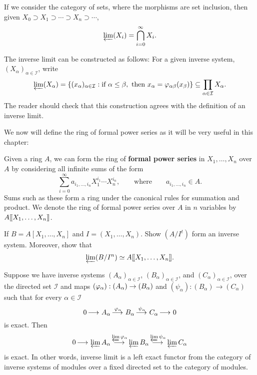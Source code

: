 \documentclass{ximera}
\begin{document}
\begin{example} If we consider the category of sets, where the morphisms are set inclusion, then given $X_0\supset X_1\supset \cdots \supset X_n\supset \cdots$,
\[
\varprojlim(X_i) = \bigcap_{i=0}^\infty X_i.
\]
\end{example}

\begin{example} The inverse limit can be constructed as follows: For a given inverse system, $(X_\alpha)_{\alpha\in \mathcal{I}}$, write
\[
\varprojlim(X_\alpha) = \{(x_\alpha)_{\alpha\in \mathcal{I}}:\text{if }\alpha\le \beta,\text{ then }x_\alpha = \varphi_{\alpha\beta}(x_\beta) \}\subseteq \prod_{\alpha\in \mathcal{I}} X_\alpha.
\]
The reader should check that this construction agrees with the definition of an inverse limit.
\end{example}

We now will define the ring of formal power series as it will be very useful in this chapter: 

\begin{definition} Given a ring $A$, we can form the ring of \textbf{formal power series} in $X_1,\dots,X_n$ over $A$ by considering all infinite sums of the form
\[
\sum_{i=0}^\infty a_{i_1,\dots, i_n}X_1^{i_1}\cdots X_n^{i_n},\qquad\text{where} \qquad a_{i_1,\dots, i_n}\in A.
\]
Sums such as these form a ring under the canonical rules for summation and product. We denote the ring of formal power series over $A$ in $n$ variables by $A[\hspace{-0.25ex}[ X_1,\dots,X_n]\hspace{-0.25ex}]$.
\end{definition}

\begin{exercise} If $B = A[X_1,\dots,X_n]$ and $I = (X_1,\dots,X_n)$. Show $(A/I^t)$ form an inverse system. Moreover, show that
\[
\varprojlim(B/I^n) \simeq A[\hspace{-0.25ex}[ X_1,\dots,X_n]\hspace{-0.25ex}].
\]
\end{exercise}


\begin{exercise} \label{invlimleftexact}
Suppose we have inverse systems $(A_\alpha)_{\alpha \in \mathcal{I}}$, $(B_\alpha)_{\alpha \in \mathcal{I}}$, and $(C_\alpha)_{\alpha \in \mathcal{I}}$, over the directed set $\mathcal{I}$ and maps $(\varphi_\alpha):(A_\alpha) \to (B_\alpha)$ and $(\psi_\alpha):(B_\alpha) \to (C_\alpha)$ such that for every $\alpha \in \mathcal{I}$
\[
0 \mathop{\longrightarrow\,}\limits A_\alpha \mathop{\longrightarrow\,}\limits^{\varphi_\alpha} B_\alpha \mathop{\longrightarrow\,}\limits^{\psi_\alpha} C_\alpha\mathop{\longrightarrow\,}\limits 0
\]
is exact.  Then
\[
0 \mathop{\longrightarrow\,}\limits \varprojlim A_\alpha \mathop{\longrightarrow\,}\limits^{\varprojlim \varphi_\alpha} \varprojlim B_\alpha \mathop{\longrightarrow\,}\limits^{\varprojlim \psi_\alpha} \varprojlim C_\alpha
\]
is exact.  In other words, inverse limit is a left exact functor from the category of inverse systems of modules over a fixed directed set to the category of modules.
\end{exercise}
\end{document}
